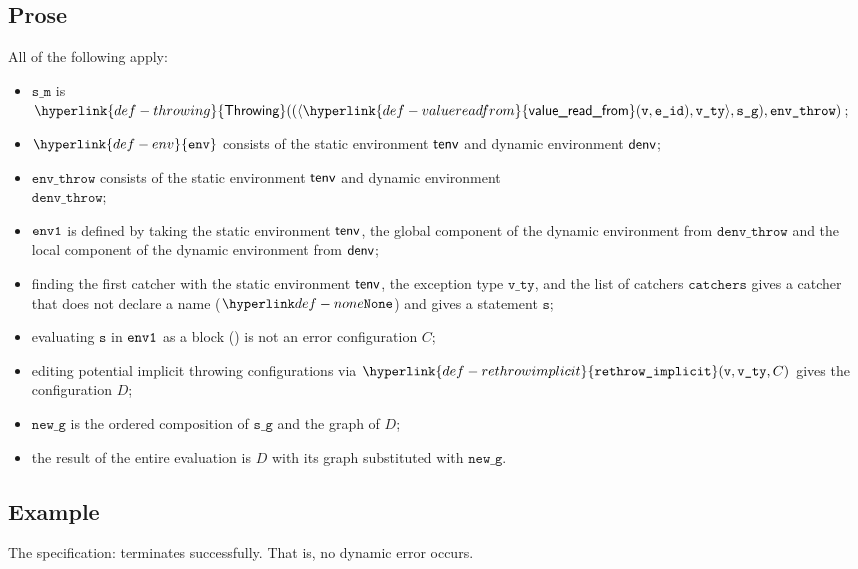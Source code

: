 \documentclass{book}
\newcommand\ErrorConfig[0]{\hyperlink{def-errorconfig}{\texttt{\#DE}}}
\newcommand\ProseOrError[0]{\ProseTerminateAs{\ErrorConfig}}
\newcommand\rethrowimplicit[0]{\hyperlink{def-rethrowimplicit}{\texttt{rethrow\_implicit}}}
\newcommand\valuereadfrom[0]{\hyperlink{def-valuereadfrom}{\textsf{value\_read\_from}}}
\newcommand\Throwing[0]{\hyperlink{def-throwing}{\textsf{Throwing}}}
\newcommand\env[0]{\hyperlink{def-env}{\texttt{env}}}
\newcommand\newg[0]{\texttt{new\_g}}
\newcommand\vs[0]{\texttt{s}}
\newcommand\catchers[0]{\texttt{catchers}}
\newcommand\envthrow[0]{\texttt{env\_throw}}
\newcommand\denvthrow[0]{\texttt{denv\_throw}}
\newcommand\sm[0]{\texttt{s\_m}}
\newcommand\sg[0]{\texttt{s\_g}}
\newcommand\vvty[0]{\texttt{v\_ty}}
\newcommand\eid[0]{\texttt{e\_id}}
\begin{document}
\subsection{Prose}
All of the following apply:
\begin{itemize}
  \item $\sm$ is $\Throwing((\langle \valuereadfrom(\vv, \eid), \vvty \rangle, \sg), \envthrow)$;
  \item $\env$ consists of the static environment $\textsf{tenv}$ and dynamic environment $\textsf{denv}$;
  \item $\envthrow$ consists of the static environment $\textsf{tenv}$ and dynamic environment \\ $\denvthrow$;
  \item $\texttt{env1}$ is defined by taking the static environment $\textsf{tenv}$, the global component of the dynamic
        environment from $\denvthrow$ and the local component of the dynamic environment from $\textsf{denv}$;
  \item finding the first catcher with the static environment $\textsf{tenv}$, the exception type $\vvty$,
  and the list of catchers $\catchers$ gives a catcher that does not declare a name ($\None$) and gives a statement $\vs$;
  \item evaluating $\vs$ in $\texttt{env1}$ as a block () is not an error
        configuration $C$\ProseOrError;
  \item editing potential implicit throwing configurations via $\rethrowimplicit(\vv, \vvty, C)$
        gives the configuration $D$;
  \item $\newg$ is the ordered composition of $\sg$ and the graph of $D$;
  \item the result of the entire evaluation is $D$ with its graph substituted with $\newg$.
\end{itemize}

\subsection{Example}
The specification:
terminates successfully. That is, no dynamic error occurs.

\end{document}
